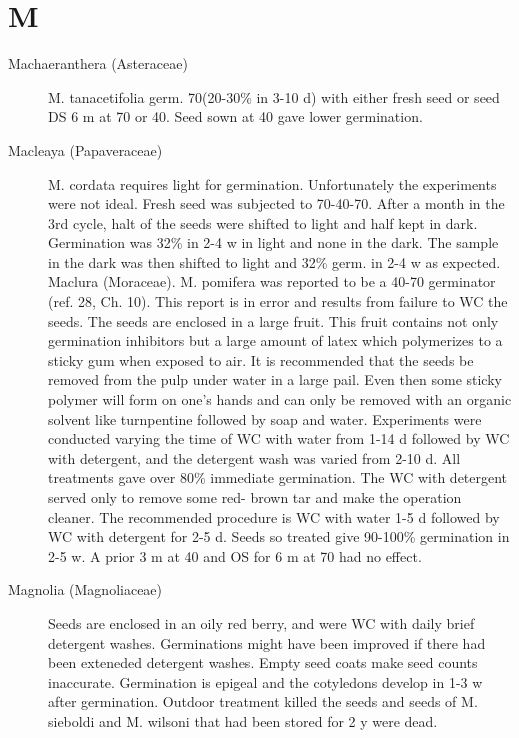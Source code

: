 \section{M}
\begin{description}

\item[Machaeranthera (Asteraceae)] M. tanacetifolia germ. 70(20-30\% in 3-10
d) with either fresh seed or seed DS 6 m at 70 or 40. Seed sown at 40 gave lower
germination.

\item[Macleaya (Papaveraceae)] M. cordata requires light for germination.
Unfortunately the experiments were not ideal. Fresh seed was subjected to 70-40-70.
After a month in the 3rd cycle, halt of the seeds were shifted to light and half kept in
dark. Germination was 32\% in 2-4 w in light and none in the dark. The sample in the
dark was then shifted to light and 32\% germ. in 2-4 w as expected.
Maclura (Moraceae). M. pomifera was reported to be a 40-70 germinator
(ref. 28, Ch. 10). This report is in error and results from failure to WC the seeds. The
seeds are enclosed in a large fruit. This fruit contains not only germination inhibitors
but a large amount of latex which polymerizes to a sticky gum when exposed to air. It
is recommended that the seeds be removed from the pulp under water in a large pail.
Even then some sticky polymer will form on one's hands and can only be removed
with an organic solvent like turnpentine followed by soap and water. Experiments
were conducted varying the time of WC with water from 1-14 d followed by WC with
detergent, and the detergent wash was varied from 2-10 d. All treatments gave over
80\% immediate germination. The WC with detergent served only to remove some red-
brown tar and make the operation cleaner. The recommended procedure is WC with
water 1-5 d followed by WC with detergent for 2-5 d. Seeds so treated give 90-100\%
germination in 2-5 w. A prior 3 m at 40 and OS for 6 m at 70 had no effect.

\item[Magnolia (Magnoliaceae)] Seeds are enclosed in an oily red berry, and
were WC with daily brief detergent washes. Germinations might have been improved
if there had been exteneded detergent washes. Empty seed coats make seed counts
inaccurate. Germination is epigeal and the cotyledons develop in 1-3 w after
germination. Outdoor treatment killed the seeds and seeds of M. sieboldi and M.
wilsoni that had been stored for 2 y were dead.


\end{description}
